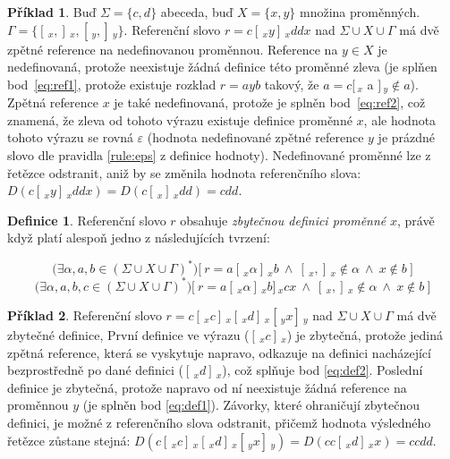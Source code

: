 \documentclass[thesis=B,czech]{FITthesis}[2019/12/23]
\theoremstyle{definition}
\newtheorem{definition}{Definice}[chapter]
\newtheorem{example}{Příklad}[chapter]
\begin{document}
\begin{example}
	Buď $\Sigma = \{c, d\}$ abeceda, buď $X=\{x, y\}$ množina proměnných. $\Gamma = \{[\,_x , ]\,_x, [\,_y , ]\,_y\}$. Referenční slovo $r = c [\,_x y ]\,_x ddx$ nad $\Sigma\cup X\cup\Gamma$ má dvě zpětné reference na nedefinovanou proměnnou. Reference na $y \in X$ je nedefinovaná, protože neexistuje žádná definice této proměnné zleva (je splňen bod~\ref{eq:ref1}, protože existuje rozklad $r=ayb$ takový, že $a = c [\,_x$ a $]\,_y \notin a$). Zpětná reference $x$ je také nedefinovaná, protože je splněn bod~\ref{eq:ref2}, což znamená, že zleva od tohoto výrazu existuje definice proměnné $x$, ale hodnota tohoto výrazu se rovná $\varepsilon$ (hodnota nedefinované zpětné reference $y$ je prázdné slovo dle pravidla \ref{rule:eps} z definice hodnoty). Nedefinované proměnné lze z řetězce odstranit, aniž by se změnila hodnota referenčního slova: $D( c [\,_x y ]\,_x ddx ) = D(c [\,_x ]\,_x d d) = cdd$.
\end{example}

\begin{definition}\label{def:ref}
Referenční slovo $r$ obsahuje \emph{zbytečnou definici proměnné} $x$, právě když platí alespoň jedno z následujících tvrzení:

	\begin{equation}\label{eq:def1}\bigg (\exists  \alpha, a, b \in \left(\Sigma \cup X \cup \Gamma\right)^\ast\bigg) \bigg [ \ r = a [\,_x \alpha  ]\,_x b \ \wedge \  [\,_x, ]\,_x \notin \alpha  \ \wedge \ x \notin b \ \bigg] \end{equation}
	\begin{equation}\label{eq:def2}\bigg(\exists  \alpha, a, b, c \in \left(\Sigma \cup X \cup \Gamma\right)^\ast\bigg) \bigg [ \ r = a [\,_x \alpha  ]\,_x b  ]\,_x c x \ \wedge \  [\,_x, ]\,_x \notin \alpha  \ \wedge \ x \notin b \ \bigg ]\end{equation}
\end{definition}

\begin{example}
	Referenční slovo $r = c [\,_x c ]\,_x [\,_x d ]\,_x [\,_y x ]\,_y$ nad $\Sigma\cup X\cup\Gamma$ má dvě zbytečné definice, První definice ve výrazu ($[\,_x c ]\,_x$) je zbytečná, protože jediná zpětná reference, která se vyskytuje napravo, odkazuje na definici nacházející bezprostředně po dané definici ($ [\,_x d ]\,_x$), což splňuje bod \ref{eq:def2}. Poslední definice je zbytečná, protože napravo od ní neexistuje žádná reference na proměnnou $y$ (je splněn bod \ref{eq:def1}). Závorky, které ohraničují zbytečnou definici, je možné z referenčního slova odstranit, přičemž hodnota výsledného řetězce zůstane stejná: $D(c [\,_x c ]\,_x [\,_x d ]\,_x [\,_y x ]\,_y)=D(c c [\,_x d ]\,_x x)=ccdd$.
\end{example}
\end{document}
